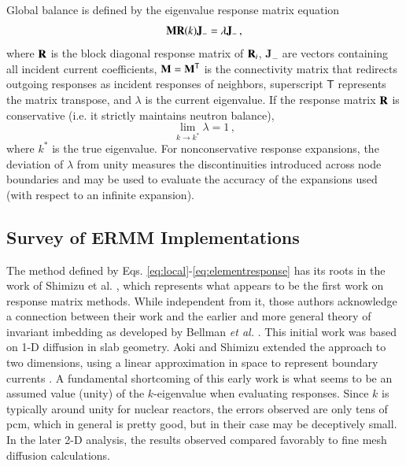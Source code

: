 Global balance is defined by the eigenvalue response matrix
equation
\begin{equation}
  \mathbf{M}\mathbf{R}(k)\mathbf{J_-}  = \lambda \mathbf{J_-} \, ,
  \label{eq:erme}
\end{equation}
where 
$\mathbf{R}$ is the block diagonal response matrix of $\mathbf{R}_i$,  
$\mathbf{J}_{-}$ are vectors containing all incident current coefficients, 
$\mathbf{M}=\mathbf{M}^\mathsf{T}$ is 
the connectivity matrix that redirects outgoing responses as incident
responses of neighbors, superscript $\mathsf{T}$ represents the matrix 
transpose, and $\lambda$ is the current eigenvalue.  
If the response matrix $\mathbf{R}$ is conservative (i.e. it
strictly maintains neutron balance),
\begin{equation}
 \lim_{k\to k^*} \lambda = 1 \, ,
\end{equation}
where $k^*$ is the true eigenvalue.
For nonconservative response expansions, the deviation of $\lambda$ from
unity measures the discontinuities introduced across node boundaries and 
may be used to evaluate the accuracy of the expansions used (with 
respect to an infinite expansion).


\subsection{Survey of ERMM Implementations}

The method defined by
Eqs. \ref{eq:local}-\ref{eq:elementresponse} has its roots in
 the work of Shimizu et al.
\cite{shimizu1963rmm, shimizu1963arm}, 
which represents what appears to be the first work on response 
matrix methods.  While independent from it, those authors 
acknowledge a connection between their work and the earlier and 
more general theory of invariant imbedding as developed by 
Bellman {\it et al.} \cite{bellman1960iim}.  This initial work was 
based on 1-D diffusion in slab geometry. 
Aoki and Shimizu extended the approach to two dimensions, 
using a linear approximation in space to represent boundary
currents \cite{aoki1965arm}.
A fundamental shortcoming of this early work is what seems to
be an assumed value (unity) of the $k$-eigenvalue when evaluating responses.
Since $k$ is typically around unity for nuclear reactors, the errors 
observed are only tens of pcm, which in general is pretty good, but in 
their case may be deceptively small.  In the later 2-D analysis, the 
results observed compared favorably to fine mesh diffusion calculations.

